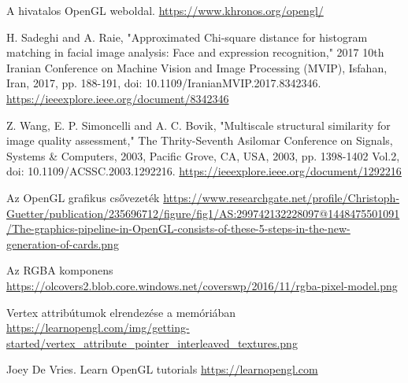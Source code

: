 %
%


\begin{thebibliography}{9}





A hivatalos OpenGL weboldal.
\newline \url{https://www.khronos.org/opengl/}

H. Sadeghi and A. Raie, "Approximated Chi-square distance for histogram matching in facial image analysis: Face and expression recognition," 2017 10th Iranian Conference on Machine Vision and Image Processing (MVIP), Isfahan, Iran, 2017, pp. 188-191, doi: 10.1109/IranianMVIP.2017.8342346.
\newline \url{https://ieeexplore.ieee.org/document/8342346}

Z. Wang, E. P. Simoncelli and A. C. Bovik, "Multiscale structural similarity for image quality assessment," The Thrity-Seventh Asilomar Conference on Signals, Systems \& Computers, 2003, Pacific Grove, CA, USA, 2003, pp. 1398-1402 Vol.2, doi: 10.1109/ACSSC.2003.1292216.
\newline \url{https://ieeexplore.ieee.org/document/1292216}

Az OpenGL grafikus csővezeték \newline
\url{https://www.researchgate.net/profile/Christoph-Guetter/publication/235696712/figure/fig1/AS:299742132228097@1448475501091/The-graphics-pipeline-in-OpenGL-consists-of-these-5-steps-in-the-new-generation-of-cards.png}

Az RGBA komponens \newline
\url{https://olcovers2.blob.core.windows.net/coverswp/2016/11/rgba-pixel-model.png}

Vertex attribútumok elrendezése a memóriában
\newline \url{https://learnopengl.com/img/getting-started/vertex_attribute_pointer_interleaved_textures.png}

Joey De Vries.
Learn OpenGL tutorials \newline
\url{https://learnopengl.com}

\end{thebibliography}